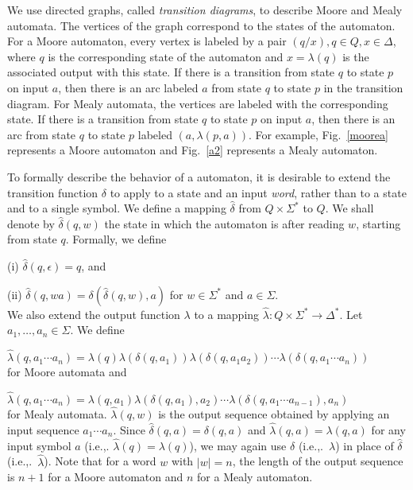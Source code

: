 We use directed graphs, called {\em transition diagrams}, to describe
Moore and Mealy automata.
The vertices of the graph correspond to the states of the automaton.
For a Moore automaton, every vertex is labeled by a pair
$(q/x),q \in Q,x \in \Delta$, where $q$ is the corresponding state of
the automaton and $x=\lambda(q)$ is the associated output with this state.
If there is a transition from state $q$ to state $p$ on input $a$,
then there is an arc labeled $a$ from state $q$ to state $p$ in the
transition diagram.
For Mealy automata, the vertices are labeled with the corresponding
state.
If there is a transition from state $q$ to state $p$ on input $a$,
then there is an arc from state $q$ to state $p$
labeled $(a,\lambda(p,a))$.
For example, Fig.~\ref{moorea} represents a Moore automaton and
Fig.~\ref{a2} represents a Mealy automaton.

To formally describe the behavior of a automaton, it is desirable
to extend the transition function $\delta$ to apply to a state and
an input {\em word}, rather than to a state and to a single symbol.
We define a mapping $\hat{\delta}$ from $Q \times \Sigma^*$ to $Q$.
We shall denote by
$\hat{\delta}(q,w)$ the state in which the automaton is
after reading $w$, starting from state $q$.
Formally, we define

(i) $\hat{\delta}(q,\epsilon) = q$, and

(ii) $\hat{\delta}(q,wa) = \delta(\hat{\delta}(q,w),a)$
for $w \in \Sigma^*$ and $a \in \Sigma$. \\
We also extend the output function $\lambda$ to a mapping
$\hat{\lambda}: Q \times \Sigma^* \rightarrow \Delta^*$.
Let $a_1, \ldots ,a_n \in \Sigma$. We define

$\hat{\lambda}(q,a_1 \cdots a_n) = \lambda(q) \lambda(\delta(q,a_1))
\lambda(\delta(q,a_1a_2)) \cdots \lambda(\delta(q,a_1 \cdots a_n))$ \\
for Moore automata and

$\hat{\lambda}(q,a_1 \cdots a_n) = \lambda(q,a_1)\lambda(\delta(q,a_1),a_2)
\cdots \lambda(\delta(q,a_1 \cdots a_{n-1}), a_n)$ \\
for Mealy automata.
$\hat{\lambda}(q,w)$ is the output sequence
obtained by applying an input sequence $a_1 \cdots a_n$.
Since $\hat{\delta}(q,a) = \delta(q,a)$ and
$\hat{\lambda}(q,a) = \lambda(q,a)$ for any input symbol $a$
(i.e.,. $\hat{\lambda}(q) = \lambda(q)$), we may
again use $\delta$ (i.e.,.~$\lambda$) in place of $\hat{\delta}$
(i.e.,.~$\hat{\lambda}$).
Note that for a word $w$ with $|w| = n$,  the length of the output
sequence is $n +1 $ for a Moore automaton and $n$ for a Mealy automaton.


